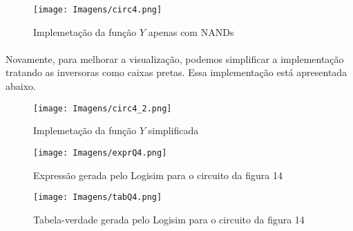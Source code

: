 \documentclass[a4paper, 12pt]{article}
\begin{document}
\begin{figure}[H]
    \centering
    \texttt{[image: Imagens/circ4.png]}
    \caption{Implemetação da função $Y$ apenas com NANDs}
\end{figure}

\paragraph{}
Novamente, para melhorar a visualização, podemos simplificar a implementação tratando as inversoras como caixas pretas. Essa implementação está apresentada abaixo.

\begin{figure}[H]
    \centering
    \texttt{[image: Imagens/circ4\_2.png]}
    \caption{Implemetação da função $Y$ simplificada}
\end{figure}

\begin{figure}[H]
    \centering
    \texttt{[image: Imagens/exprQ4.png]}
    \caption{Expressão gerada pelo Logisim para o circuito da figura 14}
\end{figure}

\begin{figure}[H]
    \centering
    \texttt{[image: Imagens/tabQ4.png]}
    \caption{Tabela-verdade gerada pelo Logisim para o circuito da figura 14}
\end{figure}
\end{document}
